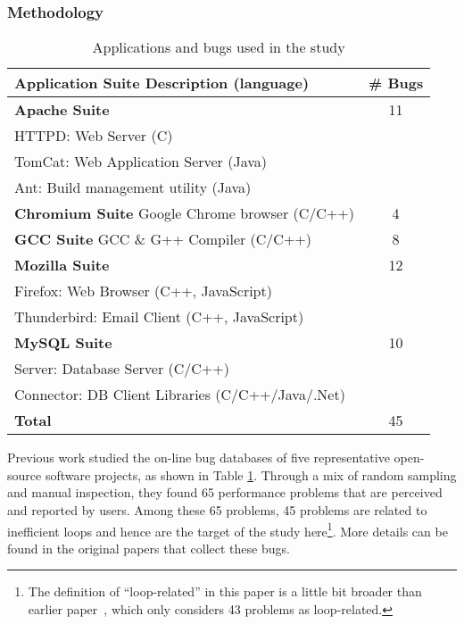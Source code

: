 \subsubsection{Methodology}
\begin{table}[h!]
\scriptsize
\centering
\begin{tabular}{@{\hspace{3pt}}l@{\hspace{3pt}}@{\hspace{3pt}}c@{\hspace{3pt}}}
\toprule
Application Suite Description (language) & \# Bugs \\
\midrule                            
{\bf Apache Suite} 	 & 11\\
{HTTPD:	Web Server (C)	}& \\
{TomCat:  Web Application Server (Java)}& \\
{Ant:	Build management utility (Java)}& \\
\midrule                            
{\bf Chromium Suite} Google Chrome browser (C/C++) & 4\\
\midrule
{\bf GCC Suite}  GCC \& G++ Compiler (C/C++)     & 8\\
\midrule
{\bf Mozilla Suite}  & 12\\
{Firefox: Web Browser (C++, JavaScript)}& 	\\
{Thunderbird: Email Client (C++, JavaScript)}& \\
\midrule
{\bf MySQL Suite}     & 10	\\
{Server: Database Server (C/C++)}&  	\\
{Connector: DB Client Libraries (C/C++/Java/.Net)} &  	\\
\midrule
{\bf Total}	   & 45 \\
\bottomrule
\end{tabular}
\caption{Applications and bugs used in the study}
\label{tab:app_bug}
\end{table}

Previous work \citep{PerfBug,SongOOPSLA2014} studied the on-line bug
databases of five representative open-source software projects, as 
shown in Table \ref{tab:app_bug}. Through a mix of random sampling and 
manual inspection, they 
found 65 performance problems that are perceived and reported by users. 
Among these 65 problems, 45 problems are related to inefficient loops and 
hence are the target of the study 
here\footnote{The definition of ``loop-related'' in this paper is a little
bit broader than earlier paper~\citep{SongOOPSLA2014}, which only considers
43 problems as loop-related. }.
More details can be found in the original papers that collect
these bugs. 


